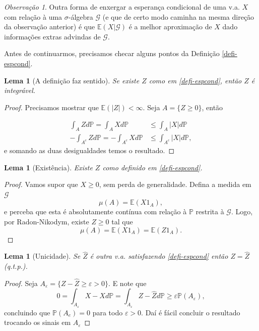 \documentclass[12pt,a4paper,oneside]{book}
\newtheorem{lemma}[theorem]{Lema}
\theoremstyle{definition}
\theoremstyle{remark}
\newtheorem{remark}[theorem]{Observa\c{c}\~ao}
\numberwithin{equation}{section}
\newcommand{\e}{\varepsilon}
\newcommand{\E}{\mathbb{E}}
\newcommand{\pr}{\mathbb{P}}
\begin{document}
\begin{tcolorbox}[colback = yellow!60]
\begin{remark}
Outra forma de enxergar a esperança condicional de uma v.a. $X$ com relação à uma $\sigma$-álgebra $\mathcal{G}$ (e que de certo modo caminha na mesma direção da observação anterior) é que $\E(X|\mathcal{G})$ é a melhor aproximação de $X$ dado informações extras advindas de $\mathcal{G}$. 
\end{remark}
\end{tcolorbox}



Antes de continuarmos, precisamos checar alguns pontos da Definição \ref{defi-espcond}.

\begin{lemma}[A definição faz sentido] Se existe $Z$ como em \ref{defi-espcond}, então $Z$ é integrável.
\end{lemma}
\begin{proof}
Precisamos mostrar que $\E(|Z|)<\infty$. Seja $A=\{Z\geq 0\}$, então


\begin{align*}
\int_A Z d\pr = \int_A X d\pr &\leq \int_A |X| d\pr  \\
-\int_{A^c} Z d\pr = -\int_{A^c} X d\pr &\leq \int_{A^c} |X| d\pr,
\end{align*}
e somando as duas desigualdades temos o resultado.
\end{proof}

\begin{lemma}[Existência] Existe $Z$ como definido em \ref{defi-espcond}.
\end{lemma}
\begin{proof}
Vamos supor que $X\geq 0$, sem perda de generalidade. Defina a medida em $\mathcal{G}$
$$\mu(A) = \E(X1_A), $$
e perceba que esta é absolutamente contínua com relação à $\pr$ restrita à $\mathcal{G}$. Logo, por Radon-Nikodym, existe $Z\geq 0$ tal que
$$\mu(A) = \E(X1_A) = \E(Z1_A). $$
\end{proof}

\begin{lemma}[Unicidade] Se $\hat{Z}$ é outra v.a. satisfazendo \ref{defi-espcond} então $Z=\hat{Z}$ (q.t.p.).
\end{lemma}
\begin{proof}
Seja $A_\e = \{Z-\hat{Z}\geq \e>0\}.$ E note que
$$0 =\int_{A_\e}X-X d\pr = \int_{A_\e}Z -\hat{Z} d\pr \geq \e \pr(A_{\e}),  $$
concluindo que $\pr(A_e)=0$ para todo $\e>0.$ Daí é fácil concluir o resultado trocando os sinais em $A_\e$
\end{proof}
\end{document}
